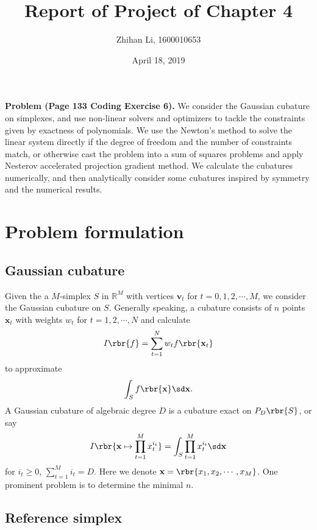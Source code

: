 \documentclass[english, nochinese]{pnote}
\title{Report of Project of Chapter 4}
\author{Zhihan Li, 1600010653}
\date{April 18, 2019}
\begin{document}
\maketitle

\textbf{Problem (Page 133 Coding Exercise 6).} We consider the Gaussian cubature on simplexes, and use non-linear solvers and optimizers to tackle the constraints given by exactness of polynomials. We use the Newton's method to solve the linear system directly if the degree of freedom and the number of constraints match, or otherwise cast the problem into a sum of squares problems and apply Nesterov accelerated projection gradient method. We calculate the cubatures numerically, and then analytically consider some cubatures inspired by symmetry and the numerical results.

\section{Problem formulation}

\subsection{Gaussian cubature}

Given the a $M$-simplex $S$ in $\mathbb{R}^M$ with vertices $\mathbf{v}_t$ for $ t = 0, 1, 2, \cdots, M $, we consider the Gaussian cubature on $S$. Generally speaking, a cubature consists of $n$ points $\mathbf{x}_t$ with weights $w_t$ for $ t = 1, 2, \cdots, N $ and calculate
\begin{equation}
I \rbr{f} = \sum_{ t = 1 }^N w_t f \rbr{\mathbf{x}_t}
\end{equation}
to approximate
\begin{equation}
\int_S f \rbr{\mathbf{x}} \sd \mathbf{x}.
\end{equation}
A Gaussian cubature of algebraic degree $D$ is a cubature exact on $ P_D \rbr{S} $, or say
\begin{equation} \label{Eq:Cons}
I \rbr{ \mathbf{x} \mapsto \prod_{ t = 1 }^M x_t^{i_t} } = \int_S \prod_{ t = 1 }^M x_t^{i_t} \sd \mathbf{x}
\end{equation}
for $ i_t \ge 0 $, $ \sum_{ t = 1 }^M i_t = D $. Here we denote $ \mathbf{x} = \rbr{ x_1, x_2, \cdots, x_M } $. One prominent problem is to determine the minimal $n$.

\subsection{Reference simplex}
\end{document}
